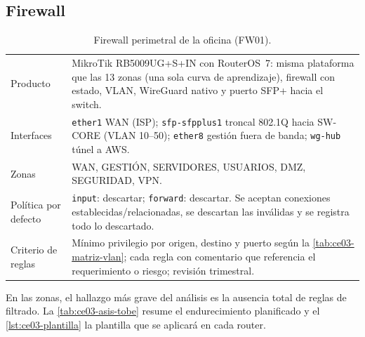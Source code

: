 \subsection{Firewall}

\begin{table}[H]
\centering
\caption{Firewall perimetral de la oficina (FW01).}
\label{tab:ce03-fw01}
\small
\begin{tabularx}{\textwidth}{L{3cm}X}
\toprule
Producto & MikroTik RB5009UG+S+IN con RouterOS~7: misma plataforma que las 13 zonas (una sola curva de aprendizaje), firewall con estado, VLAN, WireGuard nativo y puerto SFP+ hacia el switch. \\
Interfaces & \texttt{ether1} WAN (ISP); \texttt{sfp-sfpplus1} troncal 802.1Q hacia SW-CORE (VLAN 10--50); \texttt{ether8} gestión fuera de banda; \texttt{wg-hub} túnel a AWS. \\
Zonas & WAN, GESTIÓN, SERVIDORES, USUARIOS, DMZ, SEGURIDAD, VPN. \\
Política por defecto & \texttt{input}: descartar; \texttt{forward}: descartar. Se aceptan conexiones establecidas/relacionadas, se descartan las inválidas y se registra todo lo descartado. \\
Criterio de reglas & Mínimo privilegio por origen, destino y puerto según la \cref{tab:ce03-matriz-vlan}; cada regla con comentario que referencia el requerimiento o riesgo; revisión trimestral. \\
\bottomrule
\end{tabularx}
\end{table}

En las zonas, el hallazgo más grave del análisis es la ausencia total de reglas de
filtrado. La \cref{tab:ce03-asis-tobe} resume el endurecimiento planificado y el
\cref{lst:ce03-plantilla} la plantilla que se aplicará en cada router.

